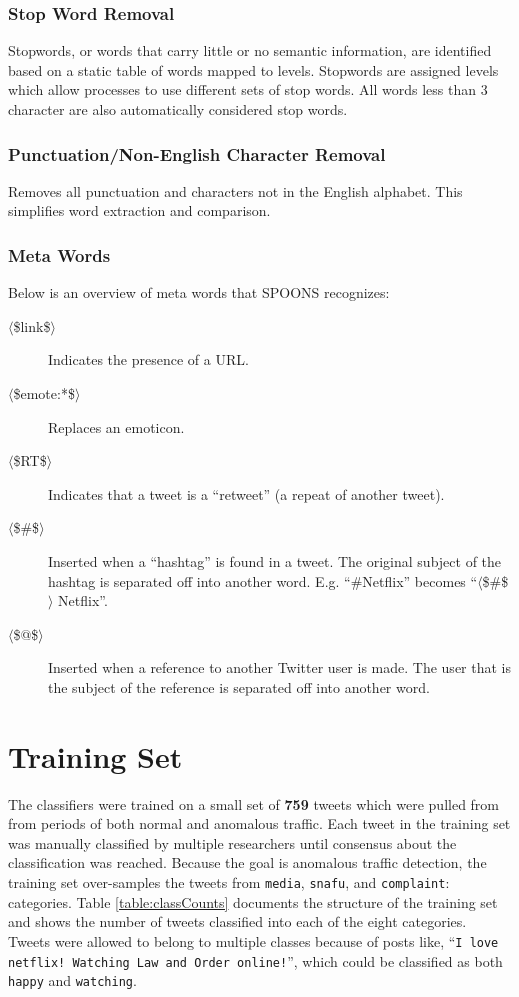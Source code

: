 \documentclass[12pt]{ucthesis}
\begin{document}
\subsection{Stop Word Removal}
\label{class-filter-stopword}
Stopwords, or words that carry little or no semantic information, are identified based
on a static table of words mapped to levels. Stopwords are assigned levels which allow
processes to use different sets of stop words. All words less than 3 character are also
automatically considered stop words.

\subsection{Punctuation/Non-English Character Removal}
\label{class-filter-noneng}
Removes all punctuation and
characters not in the English alphabet. This simplifies word extraction and
comparison.

\subsection{Meta Words}
\label{class-filter-meta}
Below is an overview of meta words that SPOONS recognizes:
\begin{description}
   \item[$\langle$\$link\$$\rangle$] Indicates the presence of a URL.
   \item[$\langle$\$emote:*\$$\rangle$] Replaces an emoticon.
   \item[$\langle$\$RT\$$\rangle$] Indicates that a tweet is a ``retweet'' (a repeat of another tweet).
   \item[$\langle$\$\#\$$\rangle$] Inserted when a ``hashtag'' is found in a tweet. The original subject of the hashtag is separated off into another word. E.g. ``\#Netflix'' becomes ``$\langle$\$\#\$$\rangle$ Netflix''.
   \item[$\langle$\$@\$$\rangle$] Inserted when a reference to another Twitter user is made. The user that is the subject of the reference is separated off into another word.
\end{description}

\chapter{Training Set}
\label{class-training-set}

The classifiers were trained on a small set of \textbf{759} tweets which were pulled from from periods of both normal and
anomalous traffic. Each tweet in the training set was manually classified by multiple researchers until consensus
about the classification was reached. Because the goal is anomalous traffic detection, the training set over-samples the
tweets from \texttt{media}, \texttt{snafu}, and \texttt{complaint}: categories. Table \ref{table:classCounts} documents
the structure of the training set and shows the  number of tweets classified into each of the eight categories.
Tweets were allowed to belong to multiple classes because of posts like, ``\texttt{I love netflix! Watching Law and Order
online!}'', which could be classified as both \texttt{happy} and \texttt{watching}.
\end{document}
